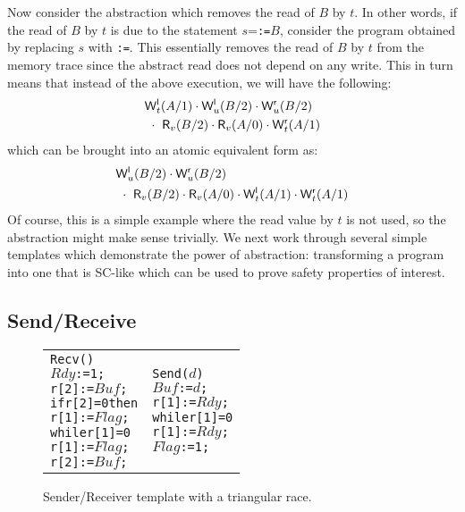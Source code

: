 Now consider the abstraction which removes the read of $B$ by $t$.
In other words, if the read of $B$ by $t$ is due to the statement $s$={\tt {}:=$B$}, consider the program obtained by replacing $s$ with {\tt {}:=\alihavocval}.
This essentially removes the read of $B$ by $t$ from the memory trace since the abstract read does not depend on any write.
This in turn means that instead of the above execution, we will have the following:
\begin{eqnarray*}
&\mathsf{W}^{\mathsf{l}}_{t}(A/1) \cdot \mathsf{W}^{\mathsf{l}}_{u}(B/2) \cdot \mathsf{W}^{\mathsf{r}}_{u}(B/2)\\
&\ \cdot\ \mathsf{R}_{v}(B/2) \cdot \mathsf{R}_{v}(A/0) \cdot \mathsf{W}^{\mathsf{r}}_{t}(A/1)
\end{eqnarray*}
which can be brought into an atomic equivalent form as:
\begin{eqnarray*}
&\mathsf{W}^{\mathsf{l}}_{u}(B/2) \cdot \mathsf{W}^{\mathsf{r}}_{u}(B/2)\\
&\ \cdot\ \mathsf{R}_{v}(B/2) \cdot \mathsf{R}_{v}(A/0) \cdot \mathsf{W}^{\mathsf{l}}_{t}(A/1) \cdot \mathsf{W}^{\mathsf{r}}_{t}(A/1)
\end{eqnarray*}
Of course, this is a simple example where the read value by $t$ is not used, so the abstraction might make sense trivially. 
We next work through several simple templates which demonstrate the power of abstraction: transforming a program into one that is SC-like which can be used to prove safety properties of interest.
 
\subsection{Send/Receive}
\label{subsec:send-receive}

\begin{figure}[h]
\begin{tabular}{p{}p{}}
\begin{alltt}Recv()
 \(Rdy\):=1;
 r[2]:=\(Buf\);
 if r[2]=0 then
   r[1]:=\(Flag\);
   while r[1]=0 
     r[1]:=\(Flag\);
   r[2]:=\(Buf\);\end{alltt}
&
\begin{alltt}Send(\(d\))
 \(Buf\):=\(d\);
 r[1]:=\(Rdy\);
 while r[1]=0 
   r[1]:=\(Rdy\);
 \(Flag\):=1;\end{alltt}
\end{tabular}
\caption{Sender/Receiver template with a triangular race.}
\label{fig:send-receive}
\end{figure}

